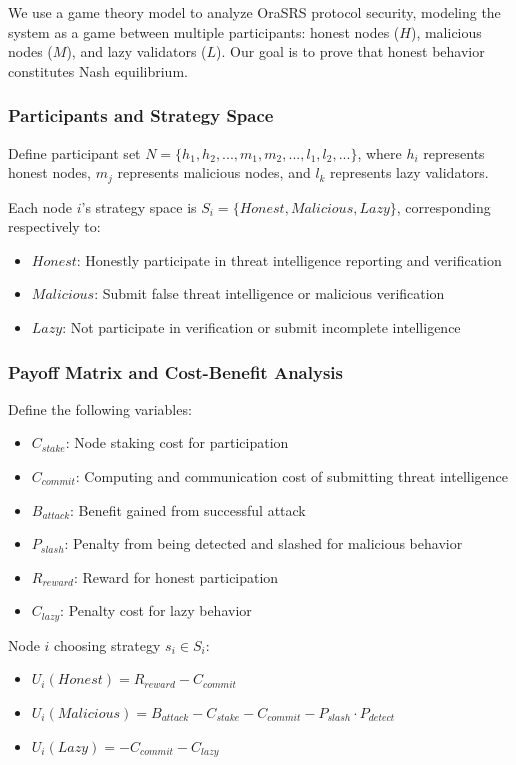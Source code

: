 \documentclass[12pt]{article}
\begin{document}
We use a game theory model to analyze OraSRS protocol security, modeling the system as a game between multiple participants: honest nodes ($H$), malicious nodes ($M$), and lazy validators ($L$). Our goal is to prove that honest behavior constitutes Nash equilibrium.

\subsubsection{Participants and Strategy Space}
Define participant set $N = \{h_1, h_2, ..., m_1, m_2, ..., l_1, l_2, ...\}$, where $h_i$ represents honest nodes, $m_j$ represents malicious nodes, and $l_k$ represents lazy validators.

Each node $i$'s strategy space is $S_i = \{Honest, Malicious, Lazy\}$, corresponding respectively to:
\begin{itemize}
\item $Honest$: Honestly participate in threat intelligence reporting and verification
\item $Malicious$: Submit false threat intelligence or malicious verification
\item $Lazy$: Not participate in verification or submit incomplete intelligence
\end{itemize}

\subsubsection{Payoff Matrix and Cost-Benefit Analysis}

Define the following variables:
\begin{itemize}
\item $C_{stake}$: Node staking cost for participation
\item $C_{commit}$: Computing and communication cost of submitting threat intelligence
\item $B_{attack}$: Benefit gained from successful attack
\item $P_{slash}$: Penalty from being detected and slashed for malicious behavior
\item $R_{reward}$: Reward for honest participation
\item $C_{lazy}$: Penalty cost for lazy behavior
\end{itemize}

Node $i$ choosing strategy $s_i \in S_i$:

\begin{itemize}
\item $U_i(Honest) = R_{reward} - C_{commit}$
\item $U_i(Malicious) = B_{attack} - C_{stake} - C_{commit} - P_{slash} \cdot P_{detect}$
\item $U_i(Lazy) = -C_{commit} - C_{lazy}$
\end{itemize}
\end{document}

